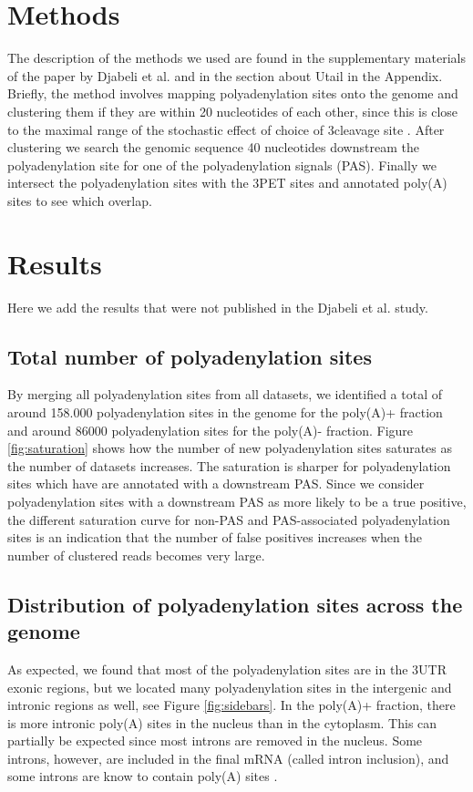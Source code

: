 \section{Methods}
The description of the methods we used are found in the supplementary materials
of the paper by Djabeli et al. and in the section about Utail in the Appendix.
Briefly, the method involves mapping polyadenylation sites onto the genome and
clustering them if they are within 20 nucleotides of each other, since this is
close to the maximal range of the stochastic effect of choice of 3\p cleavage
site \cite{tian_large-scale_2005}. After clustering we search the genomic
sequence 40 nucleotides downstream the polyadenylation site for one of the
polyadenylation signals (PAS). Finally we intersect the polyadenylation sites
with the 3\p PET sites and annotated poly(A) sites to see which overlap.

\section{Results}
Here we add the results that were not published in the Djabeli et al. study.

\subsection{Total number of polyadenylation sites}
By merging all polyadenylation sites from all datasets, we identified a total
of around 158.000 polyadenylation sites in the genome for the poly(A)+ fraction
and around 86000 polyadenylation sites for the poly(A)- fraction. Figure
\ref{fig:saturation} shows how the number of new polyadenylation sites
saturates as the number of datasets increases. The saturation is sharper for
polyadenylation sites which have are annotated with a downstream PAS. Since we
consider polyadenylation sites with a downstream PAS as more likely to be a
true positive, the different saturation curve for non-PAS and PAS-associated
polyadenylation sites is an indication that the number of false positives
increases when the number of clustered reads becomes very large. 

\subsection{Distribution of polyadenylation sites across the genome}
As expected, we found that most of the polyadenylation sites are in the 3\p UTR
exonic regions, but we located many polyadenylation sites in the intergenic
and intronic regions as well, see Figure \ref{fig:sidebars}. In the poly(A)+
fraction, there is more intronic poly(A) sites in the nucleus than in the
cytoplasm. This can partially be expected since most introns are removed in the
nucleus. Some introns, however, are included in the final mRNA (called intron
inclusion), and some introns are know to contain poly(A) sites
\cite{tian_widespread_2007}. 


